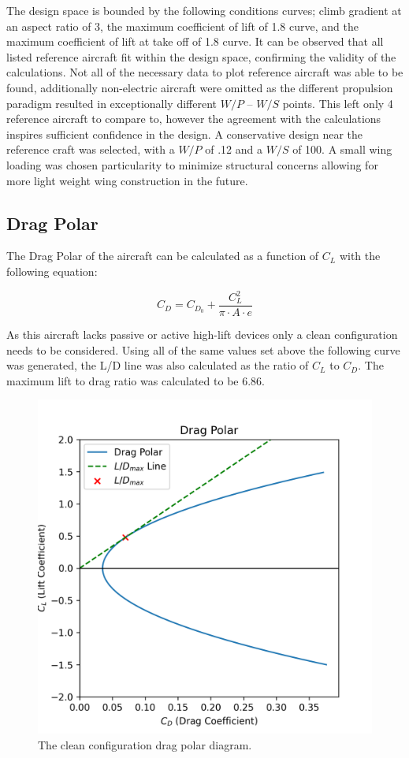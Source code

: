\documentclass[12pt]{article}
\begin{document}
	The design space is bounded by the following conditions curves; climb gradient at an aspect ratio of 3, the maximum coefficient of lift of 1.8 curve, and the maximum coefficient of lift at take off of 1.8 curve. It can be observed that all listed reference aircraft fit within the design space, confirming the validity of the calculations. Not all of the necessary data to plot reference aircraft was able to be found, additionally non-electric aircraft were omitted as the different propulsion paradigm resulted in exceptionally different $W/P$ – $W/S$ points. This left only 4 reference aircraft to compare to, however the agreement with the calculations inspires sufficient confidence in the design. A conservative design near the reference craft was selected, with a $W/P$ of .12 and a $W/S$ of 100. A small wing loading was chosen particularity to minimize structural concerns allowing for more light weight wing construction in the future. 
	
	\subsection{Drag Polar}
	The Drag Polar of the aircraft can be calculated as a function of $C_L$ with the following equation:
	
	\begin{equation}
		C_D = C_{D_0} + \frac{C_L^2}{\pi \cdot A \cdot e}
	\end{equation}
	
	
	As this aircraft lacks passive or active high-lift devices only a clean configuration needs to be considered. Using all of the same values set above the following curve was generated, the L/D line was also calculated as the ratio of $C_L$ to $C_D$. The maximum lift to drag ratio was calculated to be 6.86.
	
	\begin{figure}[h!]
		\centering
		\includegraphics[width=5in]{Figures/Drag_Polar.png} %
		\caption{The clean configuration drag polar diagram.}
		\label{fig:CDCL}
	\end{figure}
	\newpage
\end{document}
